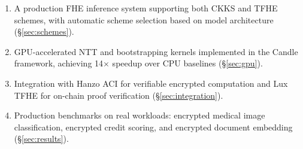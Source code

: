 \begin{enumerate}[leftmargin=1.4em]
    \item A production FHE inference system supporting both CKKS and TFHE
    schemes, with automatic scheme selection based on model architecture
    (\S\ref{sec:schemes}).
    \item GPU-accelerated NTT and bootstrapping kernels implemented in the
    Candle framework, achieving 14$\times$ speedup over CPU baselines
    (\S\ref{sec:gpu}).
    \item Integration with Hanzo ACI for verifiable encrypted computation and
    Lux TFHE for on-chain proof verification (\S\ref{sec:integration}).
    \item Production benchmarks on real workloads: encrypted medical image
    classification, encrypted credit scoring, and encrypted document
    embedding (\S\ref{sec:results}).
\end{enumerate}

